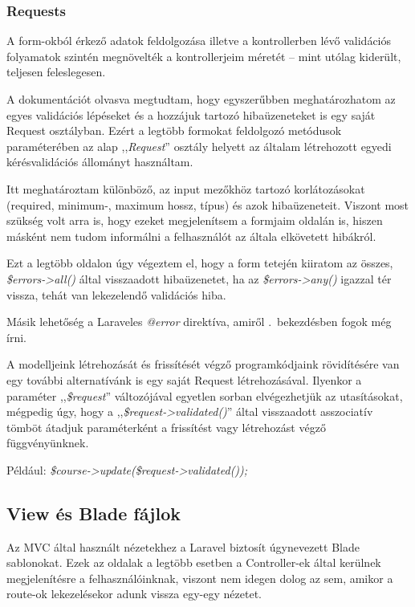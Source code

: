 \documentclass[
]{thesis-ekf}
\theoremstyle{definition}
\theoremstyle{remark}
\begin{document}
                    \subsubsection{Requests}
                    A form-okból érkező adatok feldolgozása illetve a kontrollerben lévő validációs folyamatok szintén megnövelték a kontrollerjeim méretét -- mint utólag kiderült, teljesen feleslegesen. 
                    
                    A dokumentációt olvasva megtudtam, hogy egyszerűbben meghatározhatom az egyes validációs lépéseket és a hozzájuk tartozó hibaüzeneteket is egy saját Request osztályban. Ezért a legtöbb formokat feldolgozó metódusok paraméterében az alap ,,\emph{Request}'' osztály helyett az általam létrehozott egyedi kérésvalidációs állományt használtam.

                    Itt meghatároztam különböző, az input mezőkhöz tartozó korlátozásokat (required, minimum-, maximum hossz, típus) és azok hibaüzeneteit. Viszont most szükség volt arra is, hogy ezeket megjelenítsem a formjaim oldalán is, hiszen másként nem tudom informálni a felhasználót az általa elkövetett hibákról. 
                    
                    Ezt a legtöbb oldalon úgy végeztem el, hogy a form tetején kiiratom az összes, \emph{\$errors->all()} által visszaadott hibaüzenetet, ha az \emph{\$errors->any()} igazzal tér vissza, tehát van lekezelendő validációs hiba.

                    Másik lehetőség a Laraveles \emph{@error} direktíva, amiről \az{\ref{LivewireRealTimeValidation}}.~bekezdésben fogok még írni.
                    
                    A modelljeink létrehozását és frissítését végző programkódjaink rövidítésére van egy további alternatívánk is egy saját Request létrehozásával. Ilyenkor a paraméter ,,\emph{\$request}'' változójával egyetlen sorban elvégezhetjük az utasításokat, mégpedig úgy, hogy a ,,\emph{\$request->validated()}'' által visszaadott asszociatív tömböt átadjuk paraméterként a frissítést vagy létrehozást végző függvényünknek. 
                    
                    Például: \emph{\$course->update(\$request->validated());}
                    
                \subsection{View és Blade fájlok}
                    Az MVC által használt nézetekhez a Laravel biztosít úgynevezett Blade sablonokat. Ezek az oldalak a legtöbb esetben a Controller-ek által kerülnek megjelenítésre a felhasználóinknak, viszont nem idegen dolog az sem, amikor a route-ok lekezelésekor adunk vissza egy-egy nézetet.
\end{document}
